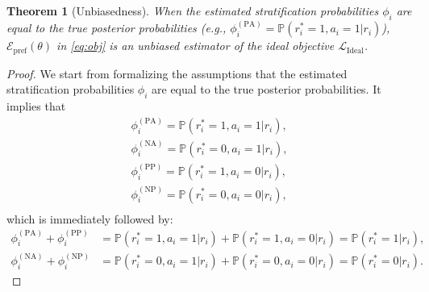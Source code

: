 \documentclass[]{arxiv_singlecolumn}
\theoremstyle{plain}
\newtheorem{theorem}{Theorem}[section]
\theoremstyle{definition}
\theoremstyle{remark}
\begin{document}
\begin{theorem}[Unbiasedness]\label{thm:unbiasedness}
    When the estimated stratification probabilities $\phi_i$ are equal to the true posterior probabilities (e.g., $\phi^\mathrm{(PA)}_i = \mathbb{P}(r^*_i=1, a_i=1|r_i)$), $\mathcal{E}_\mathrm{pref}(\theta)$ in \eqref{eq:obj} is an unbiased estimator of the ideal objective $\mathcal{L}_\mathrm{Ideal}$.
\end{theorem}

\begin{proof}
    We start from formalizing the assumptions that the estimated stratification probabilities $\phi_i$ are equal to the true posterior probabilities. It implies that 
    \begin{equation}
        \begin{aligned}
            \phi^\mathrm{(PA)}_i = \mathbb{P}(r^*_i=1, a_i=1|r_i),\\
            \phi^\mathrm{(NA)}_i = \mathbb{P}(r^*_i=0, a_i=1|r_i),\\
            \phi^\mathrm{(PP)}_i = \mathbb{P}(r^*_i=1, a_i=0|r_i),\\
            \phi^\mathrm{(NP)}_i = \mathbb{P}(r^*_i=0, a_i=0|r_i),\\
        \end{aligned}
    \end{equation}
    which is immediately followed by:
    \begin{equation}
    \begin{aligned}
        \phi^\mathrm{(PA)}_i+\phi^\mathrm{(PP)}_i &= \mathbb{P}(r^*_i=1, a_i=1|r_i) + \mathbb{P}(r^*_i=1, a_i=0|r_i) = \mathbb{P}(r^*_i=1|r_i),\\
        \phi^\mathrm{(NA)}_i+\phi^\mathrm{(NP)}_i &= \mathbb{P}(r^*_i=0, a_i=1|r_i) + \mathbb{P}(r^*_i=0, a_i=0|r_i) = \mathbb{P}(r^*_i=0|r_i).
    \end{aligned}
    \end{equation}


\end{proof}
\end{document}
